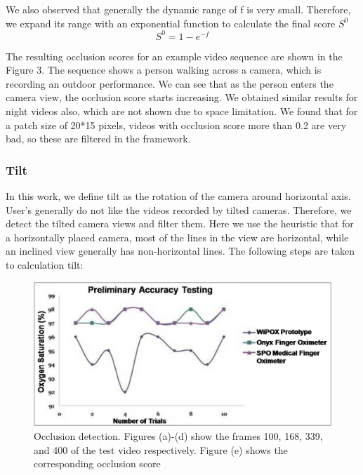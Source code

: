 \documentclass{sig-alternate}
\begin{document}
We also observed that generally the dynamic range of f is very small. Therefore, we expand its range with an exponential function to calculate the ﬁnal score \(S^0\)
\begin{equation}
S^0 = 1 - e^{−f}
\end{equation}

 The resulting occlusion scores for an example video sequence are shown in the Figure 3. The sequence shows a person walking across a camera, which is recording an outdoor performance. We can see that as the person enters the camera view, the occlusion score starts increasing. We obtained similar results for night videos also, which are not shown due to space limitation. We found that for a patch size of 20*15 pixels, videos with occlusion score more than 0.2 are very bad, so these are ﬁltered in the framework. 

\subsubsection{Tilt}
In this work, we define tilt as the rotation of the camera around horizontal axis. User's generally do not like the videos recorded by tilted cameras. Therefore, we detect the tilted camera views and filter them. Here we use the heuristic that for a horizontally placed camera, most of the lines in the view are horizontal, while an inclined view generally has non-horizontal lines. The following steps are taken to calculation tilt:

\begin{figure}[h!]
    \centering
    \includegraphics[width = \linewidth]{3.jpg}
    \caption{Occlusion detection. Figures (a)-(d) show the frames
100, 168, 339, and 400 of the test video respectively. Figure (e)
shows the corresponding occlusion score}
    \label{fig: 3}
\end{figure}
\end{document}
